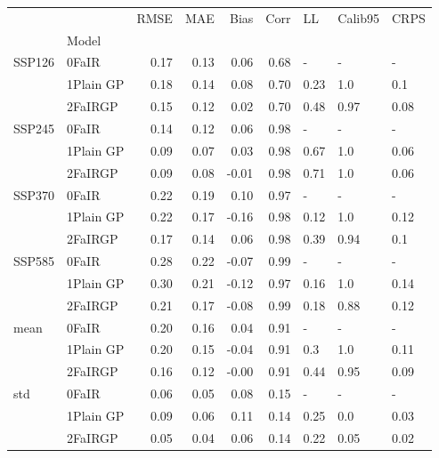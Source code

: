\begin{tabular}{llrrrrlll}
\toprule
    &         &  RMSE &   MAE &  Bias &  Corr &    LL & Calib95 &  CRPS \\
{} & Model &       &       &       &       &       &         &       \\
\midrule
SSP126 & 0FaIR &  0.17 &  0.13 &  0.06 &  0.68 &     - &       - &     - \\
    & 1Plain GP &  0.18 &  0.14 &  0.08 &  0.70 &  0.23 &     1.0 &   0.1 \\
    & 2FaIRGP &  0.15 &  0.12 &  0.02 &  0.70 &  0.48 &    0.97 &  0.08 \\
SSP245 & 0FaIR &  0.14 &  0.12 &  0.06 &  0.98 &     - &       - &     - \\
    & 1Plain GP &  0.09 &  0.07 &  0.03 &  0.98 &  0.67 &     1.0 &  0.06 \\
    & 2FaIRGP &  0.09 &  0.08 & -0.01 &  0.98 &  0.71 &     1.0 &  0.06 \\
SSP370 & 0FaIR &  0.22 &  0.19 &  0.10 &  0.97 &     - &       - &     - \\
    & 1Plain GP &  0.22 &  0.17 & -0.16 &  0.98 &  0.12 &     1.0 &  0.12 \\
    & 2FaIRGP &  0.17 &  0.14 &  0.06 &  0.98 &  0.39 &    0.94 &   0.1 \\
SSP585 & 0FaIR &  0.28 &  0.22 & -0.07 &  0.99 &     - &       - &     - \\
    & 1Plain GP &  0.30 &  0.21 & -0.12 &  0.97 &  0.16 &     1.0 &  0.14 \\
    & 2FaIRGP &  0.21 &  0.17 & -0.08 &  0.99 &  0.18 &    0.88 &  0.12 \\
mean & 0FaIR &  0.20 &  0.16 &  0.04 &  0.91 &     - &       - &     - \\
    & 1Plain GP &  0.20 &  0.15 & -0.04 &  0.91 &   0.3 &     1.0 &  0.11 \\
    & 2FaIRGP &  0.16 &  0.12 & -0.00 &  0.91 &  0.44 &    0.95 &  0.09 \\
std & 0FaIR &  0.06 &  0.05 &  0.08 &  0.15 &     - &       - &     - \\
    & 1Plain GP &  0.09 &  0.06 &  0.11 &  0.14 &  0.25 &     0.0 &  0.03 \\
    & 2FaIRGP &  0.05 &  0.04 &  0.06 &  0.14 &  0.22 &    0.05 &  0.02 \\
\bottomrule
\end{tabular}
